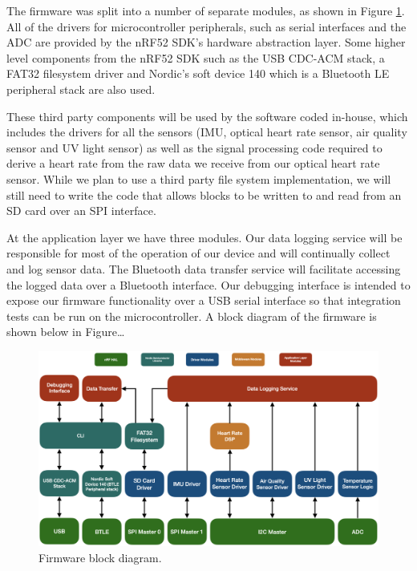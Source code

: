 The firmware was split into a number of separate modules, as shown in Figure
\ref{fig:fw_block_diag}. All of the drivers for microcontroller peripherals,
such as serial interfaces and the ADC are provided by the nRF52 SDK's hardware
abstraction layer. Some higher level components from the
nRF52 SDK such as the USB CDC-ACM stack, a FAT32 filesystem driver and Nordic's
soft device 140 which is a Bluetooth LE peripheral stack are also used.

These third party components will be used by the software coded in-house,
which includes the drivers for all the sensors (IMU, optical
heart rate sensor, air quality sensor and UV light sensor) as well as the signal
processing code required to derive a heart rate from the raw data we receive
from our optical heart rate sensor. While we plan to use a third party file
system implementation, we will still need to write the code that allows blocks
to be written to and read from an SD card over an SPI interface.

At the application layer we have three modules. Our data logging service will be
responsible for most of the operation of our device and will continually collect
and log sensor data. The Bluetooth data transfer service will facilitate
accessing the logged data over a Bluetooth interface. Our debugging interface is
intended to expose our firmware functionality over a USB serial interface so
that integration tests can be run on the microcontroller. A block diagram of the 
firmware is shown below in Figure…

\begin{figure}[!htb]
\centering
\includegraphics[width=\textwidth]{images/fw_block_diag.png}
\caption{Firmware block diagram.}
\label{fig:fw_block_diag}
\end{figure}

